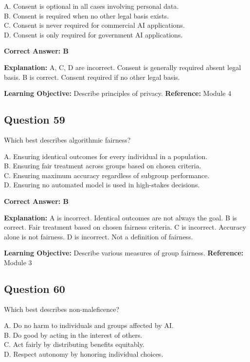 \documentclass[11pt]{article}
\begin{document}
	A. Consent is optional in all cases involving personal data.\\
	B. Consent is required when no other legal basis exists.\\
	C. Consent is never required for commercial AI applications.\\
	D. Consent is only required for government AI applications.
	
	\vspace{0.4em}
	\textbf{Correct Answer: B}
	
	\textbf{Explanation:}
	A, C, D are incorrect. Consent is generally required absent legal basis.
	B is correct. Consent required if no other legal basis.
	
	\textbf{Learning Objective:} Describe principles of privacy.
	\textbf{Reference:} Module 4
	
	\subsection*{Question 59}
	Which best describes algorithmic fairness?
	
	A. Ensuring identical outcomes for every individual in a population.\\
	B. Ensuring fair treatment across groups based on chosen criteria.\\
	C. Ensuring maximum accuracy regardless of subgroup performance.\\
	D. Ensuring no automated model is used in high-stakes decisions.
	
	\vspace{0.4em}
	\textbf{Correct Answer: B}
	
	\textbf{Explanation:}
	A is incorrect. Identical outcomes are not always the goal.
	B is correct. Fair treatment based on chosen fairness criteria.
	C is incorrect. Accuracy alone is not fairness.
	D is incorrect. Not a definition of fairness.
	
	\textbf{Learning Objective:} Describe various measures of group fairness.
	\textbf{Reference:} Module 3
	
	\subsection*{Question 60}
	Which best describes non-maleficence?
	
	A. Do no harm to individuals and groups affected by AI.\\
	B. Do good by acting in the interest of others.\\
	C. Act fairly by distributing benefits equitably.\\
	D. Respect autonomy by honoring individual choices.
	
\end{document}
